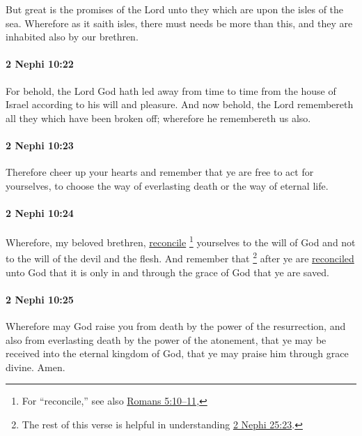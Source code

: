 			But great is the promises of the Lord unto they
			which are upon the isles of the sea.
			Wherefore as it saith isles, there must needs be more than this,
			and they are inhabited also by our brethren.

		\paragraph{2 Nephi 10:22} %
			\label{2NEPHI-10-22}

			For behold, the Lord God hath led away from time to time
			from the house of Israel according to his will and pleasure.
			And now behold, the Lord remembereth all they which have been broken off;
			wherefore he remembereth us also.

		\paragraph{2 Nephi 10:23} %
			\label{2NEPHI-10-23}

			Therefore cheer up your hearts
			and remember that ye are free to act for yourselves,
			to choose the way of everlasting death or the way of eternal life.

		\paragraph{2 Nephi 10:24} %
			\label{2NEPHI-10-24}

			Wherefore, my beloved brethren, \hyperref[RECONCILIATION]{reconcile}%
				\footnote{%
					For ``reconcile,'' see also \hyperref[ROMANS-5-10]{Romans 5:10--11},
					}
			yourselves to the will of God
			and not to the will of the devil and the flesh.
			And remember that
				\footnote{%
					The rest of this verse is helpful in understanding \hyperref[2NEPHI-25-23]{2 Nephi 25:23}.
					}%
			after ye are \hyperref[RECONCILIATION]{reconciled} unto God
			that it is only in and through the grace of God that ye are saved.

		\paragraph{2 Nephi 10:25} %
			\label{2NEPHI-10-25}

			Wherefore may God raise you from death by the power of the resurrection,
			and also from everlasting death by the power of the atonement,
			that ye may be received into the eternal kingdom of God,
			that ye may praise him through grace divine.
			Amen.

